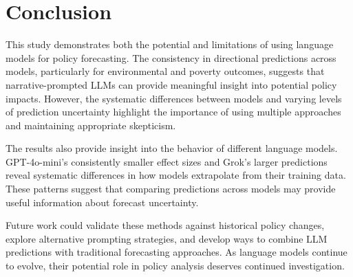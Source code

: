 \section{Conclusion}\label{sec:conclusion}

This study demonstrates both the potential and limitations of using language models for policy forecasting. The consistency in directional predictions across models, particularly for environmental and poverty outcomes, suggests that narrative-prompted LLMs can provide meaningful insight into potential policy impacts. However, the systematic differences between models and varying levels of prediction uncertainty highlight the importance of using multiple approaches and maintaining appropriate skepticism.

The results also provide insight into the behavior of different language models. GPT-4o-mini's consistently smaller effect sizes and Grok's larger predictions reveal systematic differences in how models extrapolate from their training data. These patterns suggest that comparing predictions across models may provide useful information about forecast uncertainty.

Future work could validate these methods against historical policy changes, explore alternative prompting strategies, and develop ways to combine LLM predictions with traditional forecasting approaches. As language models continue to evolve, their potential role in policy analysis deserves continued investigation.